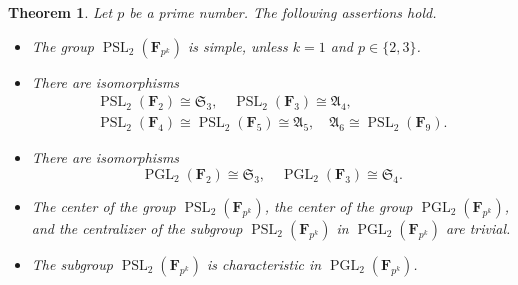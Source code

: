 \documentclass[12pt]{amsart}
\numberwithin{equation}{section}
\newtheorem{theorem}[subsection]{Theorem}
\theoremstyle{definition}
\DeclareMathOperator{\PGL}{PGL}
\DeclareMathOperator{\PSL}{PSL}
\begin{document}
\begin{theorem}
\label{theorem:PSL-PGL-basic}
Let $p$ be a prime number. The following assertions hold.
\begin{itemize}
\item[(i)]
The group $\PSL_2(\mathbf{F}_{p^k})$ is simple,
unless $k=1$ and $p\in\{2,3\}$.

\item[(ii)] There are isomorphisms
\begin{multline*}
\PSL_2(\mathbf{F}_2)\cong\mathfrak{S}_3, \quad
\PSL_2(\mathbf{F}_3)\cong\mathfrak{A}_4, \\
\PSL_2(\mathbf{F}_4)\cong \PSL_2(\mathbf{F}_5)\cong\mathfrak{A}_5, \quad
\mathfrak{A}_6\cong\PSL_2(\mathbf{F}_9).
\end{multline*}

\item[(iii)]
There are isomorphisms
$$
\PGL_2(\mathbf{F}_{2})\cong \mathfrak{S}_3, \quad
\PGL_2(\mathbf{F}_{3})\cong \mathfrak{S}_4.
$$

\item[(iv)]
The center of the group $\PSL_2(\mathbf{F}_{p^k})$, the center of the group
$\PGL_2(\mathbf{F}_{p^k})$, and the centralizer of the subgroup
$\PSL_2(\mathbf{F}_{p^k})$ in $\PGL_2(\mathbf{F}_{p^k})$
are trivial.

\item[(v)] The subgroup $\PSL_2(\mathbf{F}_{p^k})$ is characteristic
in $\PGL_2(\mathbf{F}_{p^k})$.
\end{itemize}
\end{theorem}
\end{document}
